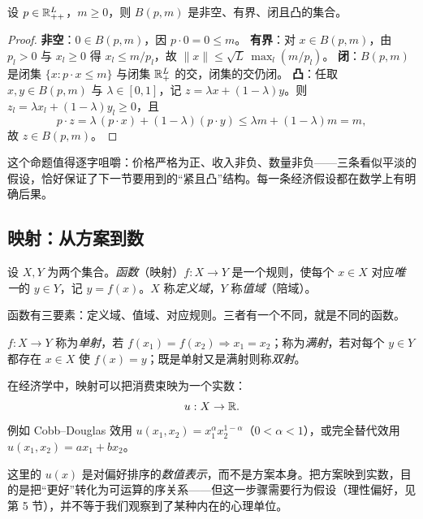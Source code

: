 \begin{proposition}[预算集的基本性质]
设 $p\in\mathbb{R}_{++}^{L}$，$m\ge 0$，则 $B(p,m)$ 是非空、有界、闭且凸的集合。
\end{proposition}

\begin{proof}
\textbf{非空}：$0\in B(p,m)$，因 $p\cdot 0=0\le m$。
\textbf{有界}：对 $x\in B(p,m)$，由 $p_l>0$ 与 $x_l\ge 0$ 得 $x_l\le m/p_l$，故 $\lVert x\rVert\le \sqrt{L}\,\max_l(m/p_l)$。
\textbf{闭}：$B(p,m)$ 是闭集 $\{x:p\cdot x\le m\}$ 与闭集 $\mathbb{R}_+^{L}$ 的交，闭集的交仍闭。
\textbf{凸}：任取 $x,y\in B(p,m)$ 与 $\lambda\in[0,1]$，记 $z=\lambda x+(1-\lambda)y$。则 $z_l=\lambda x_l+(1-\lambda)y_l\ge 0$，且
\[
p\cdot z=\lambda\,(p\cdot x)+(1-\lambda)(p\cdot y)\le \lambda m+(1-\lambda)m=m,
\]
故 $z\in B(p,m)$。
\end{proof}

\begin{remark}
这个命题值得逐字咀嚼：价格严格为正、收入非负、数量非负——三条看似平淡的假设，恰好保证了下一节要用到的“紧且凸”结构。每一条经济假设都在数学上有明确后果。
\end{remark}

\subsection{映射：从方案到数}

\begin{definition}[函数]
设 $X,Y$ 为两个集合。\emph{函数}（映射）$f:X\to Y$ 是一个规则，使每个 $x\in X$ 对应\emph{唯一}的 $y\in Y$，记 $y=f(x)$。$X$ 称\emph{定义域}，$Y$ 称\emph{值域}（陪域）。
\end{definition}

函数有三要素：定义域、值域、对应规则。三者有一个不同，就是不同的函数。

\begin{definition}[单射、满射、双射]
$f:X\to Y$ 称为\emph{单射}，若 $f(x_1)=f(x_2)\Rightarrow x_1=x_2$；称为\emph{满射}，若对每个 $y\in Y$ 都存在 $x\in X$ 使 $f(x)=y$；既是单射又是满射则称\emph{双射}。
\end{definition}

\begin{example}[效用是一种映射]
在经济学中，映射可以把消费束映为一个实数：
\[
u:X\to\mathbb{R} .
\]
例如 Cobb–Douglas 效用 $u(x_1,x_2)=x_1^{\alpha}x_2^{1-\alpha}$（$0<\alpha<1$），或完全替代效用 $u(x_1,x_2)=a x_1+b x_2$。
\end{example}

这里的 $u(x)$ 是对偏好排序的\emph{数值表示}，而不是方案本身。把方案映到实数，目的是把“更好”转化为可运算的序关系——但这一步骤需要行为假设（理性偏好，见第 5 节），并不等于我们观察到了某种内在的心理单位。

